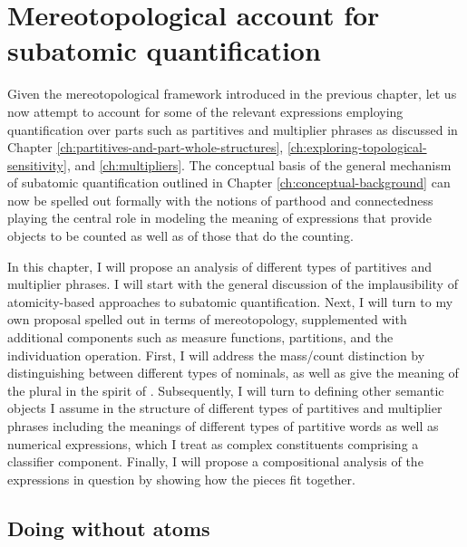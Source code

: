 	\chapter{Mereotopological account for subatomic quantification}\label{ch:mereotopological-account-for-subatomic-quantification}
	
	Given the mereotopological framework introduced in the previous chapter, let us now attempt to account for some of the relevant expressions employing quantification over parts such as partitives and multiplier phrases as discussed in Chapter \ref{ch:partitives-and-part-whole-structures}, \ref{ch:exploring-topological-sensitivity}, and \ref{ch:multipliers}. The conceptual basis of the general mechanism of subatomic quantification outlined in Chapter \ref{ch:conceptual-background} can now be spelled out formally with the notions of parthood and connectedness playing the central role in modeling the meaning of expressions that provide objects to be counted as well as of those that do the counting. 
	
	In this chapter, I will propose an analysis of different types of partitives and multiplier phrases. I will start with the general discussion of the implausibility of atomicity-based approaches to subatomic quantification. Next, I will turn to my own proposal spelled out in terms of mereotopology, supplemented with additional components such as measure functions, partitions, and the individuation operation. First, I will address the mass/count distinction by distinguishing between different types of nominals, as well as give the meaning of the plural in the spirit of \citet{grimm2012number}. Subsequently, I will turn to defining other semantic objects I assume in the structure of different types of partitives and multiplier phrases including the meanings of different types of partitive words as well as numerical expressions, which I treat as complex constituents comprising a classifier component. Finally, I will propose a compositional analysis of the expressions in question by showing how the pieces fit together.
	
	\section{Doing without atoms}\label{sec:doing-without-atoms}
	
